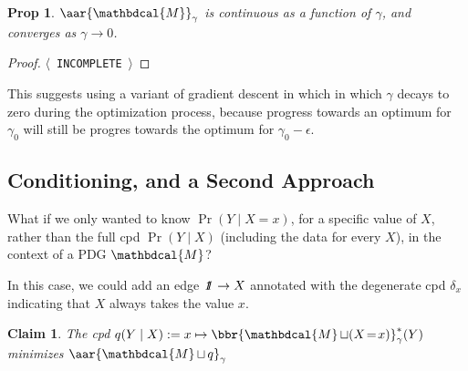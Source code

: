 \documentclass{article}
\theoremstyle{plain}
\newtheorem{prop}[theorem]{Prop}
\newtheorem{claim}[theorem]{Claim}
\theoremstyle{definition}
\theoremstyle{remark}
\let\H\relax
\DeclareMathOperator{\H}{\mathrm{H}} %
\newcommand\mat[1]{\mathbf{#1}}
\newcommand{\thickD}{I\mkern-8muD}
\newcommand{\kldiv}{\thickD\infdivx}
\newcommand{\bp}[1][L]{\mat{p}_{\!_{#1}\!}}
\newcommand{\V}{\mathcal V}
\newcommand{\dg}[1]{\mathbdcal{#1}}
\newcommand\smid{\!\mid\!}
\DeclareMathOperator{\bundle}{\sqcup}
\newcommand\commentout[1]{}
\newcommand{\pdgunit}{\mathrlap{\mathit 1} \mspace{2.3mu}\mathit 1}
\newcommand{\ed}[3]{%
	\mathchoice%
	{#2\overset{\smash{\mskip-5mu\raisebox{-3pt}{${#1}$}}}{\xrightarrow{\hphantom{\scriptstyle {#1}}}} #3} %
	{#2\overset{\smash{\mskip-5mu\raisebox{-3pt}{$\scriptstyle {#1}$}}}{\xrightarrow{\hphantom{\scriptstyle {#1}}}} #3}%
	{#2\overset{\smash{\mskip-5mu\raisebox{-3pt}{$\scriptscriptstyle {#1}$}}}{\xrightarrow{\hphantom{\scriptscriptstyle {#1}}}} #3} %
	{#2\overset{\smash{\mskip-5mu\raisebox{-3pt}{$\scriptscriptstyle {#1}$}}}{\xrightarrow{\hphantom{\scriptscriptstyle {#1}}}} #3}} %
\newcommand{\alle}[1][L]{_{\ed {#1}XY}}
\newcommand{\TODO}[1][INCOMPLETE]{{\centering\Large\color{red}$\langle$~\texttt{#1}~$\rangle$\par}}
\begin{document}
\begin{prop}
	$\aar{\dg M}_\gamma$ is continuous as a function of $\gamma$, and converges as $\gamma\to 0$. 
\end{prop}
\begin{proof}
	\par
	\TODO
\end{proof}

This suggests using a variant of gradient descent in which
in which $\gamma$ decays to zero during the optimization process, because
progress towards an optimum for $\gamma_0$ will still be progres towards  
the optimum for $\gamma_0 - \epsilon$.  




\commentout{%
	\begin{defn}[degree of inconsistency]
		If $\dg M$ is a PDG, let $\aar{\dg M}_\gamma$ denote the \emph{degree of
		inconsistency} of $\dg M$ at $\gamma$, and be given by
		$$ \aar{\dg M}_\gamma := \inf_{\mu \in \Delta[\V(\dg M)]} 
			\sum\alle \beta_L \;\kldiv{\mu_{Y|X}}{\bp} + \alpha_L\;\H_\mu(Y\mid X)
		$$
		and let $\aar[\Big]{\dg M} = \lim_{\gamma\to 0^+} \aar{\dg M}_\gamma$.
	\end{defn}

	\begin{claim}
		$$\bbr{\dg M}_\gamma(\mu) = $$
	\end{claim}
}%



\subsection{Conditioning, and a Second Approach}
What if we only wanted to know $\Pr(Y \smid X=x)$, for a specific value of $X$, rather than
the full cpd $\Pr(Y\smid X)$ (including the data for every $X$), in the context of a PDG $\dg M$?

In this case, we could add an edge $\pdgunit \to X$ annotated with the degenerate cpd $\delta_x$ 
indicating that $X$ always takes the value $x$. 

\begin{claim}
 	The cpd $q(Y \mid X) := x \mapsto \bbr{\dg M \bundle (X\!=\!x)}^*_\gamma(Y)$
	minimizes $\aar{\dg M \bundle q}_\gamma$
\end{claim} 
\end{document}
